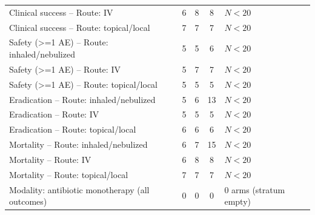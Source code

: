 \begin{tabular}{lcccl}
Clinical success -- Route: IV & 6 & 8 & 8 & $N<20$ \\
Clinical success -- Route: topical/local & 7 & 7 & 7 & $N<20$ \\
Safety (>=1 AE) -- Route: inhaled/nebulized & 5 & 5 & 6 & $N<20$ \\
Safety (>=1 AE) -- Route: IV & 5 & 7 & 7 & $N<20$ \\
Safety (>=1 AE) -- Route: topical/local & 5 & 5 & 5 & $N<20$ \\
Eradication -- Route: inhaled/nebulized & 5 & 6 & 13 & $N<20$ \\
Eradication -- Route: IV & 5 & 5 & 5 & $N<20$ \\
Eradication -- Route: topical/local & 6 & 6 & 6 & $N<20$ \\
Mortality -- Route: inhaled/nebulized & 6 & 7 & 15 & $N<20$ \\
Mortality -- Route: IV & 6 & 8 & 8 & $N<20$ \\
Mortality -- Route: topical/local & 7 & 7 & 7 & $N<20$ \\
Modality: antibiotic monotherapy (all outcomes) & 0 & 0 & 0 & 0 arms (stratum empty) \\
\bottomrule
\end{tabular}
